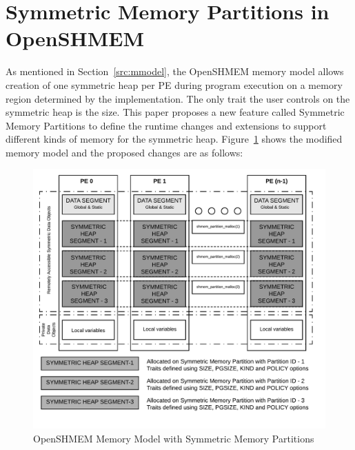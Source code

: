 \section{Symmetric Memory Partitions in OpenSHMEM}
\label{src:smempart}

As mentioned in Section~\ref{src:mmodel}, the OpenSHMEM memory
model allows creation of one symmetric heap per PE during program
execution on a memory region determined by the implementation. The
only trait the user controls on the symmetric heap is the size.
This paper proposes a new feature called Symmetric Memory Partitions
to define the runtime changes and extensions to support different
kinds of memory for the symmetric heap. Figure~\ref{fig:smem-model}
shows the modified memory model and the proposed changes are as
follows:

\begin{figure}[!h]
    \vspace{-20pt}
    \hspace*{5mm}
    \includegraphics[scale=0.20]{image/smem-model.png}
    \vspace{-25pt}
    \caption{OpenSHMEM Memory Model with Symmetric Memory Partitions}
    \label{fig:smem-model}
\end{figure}

